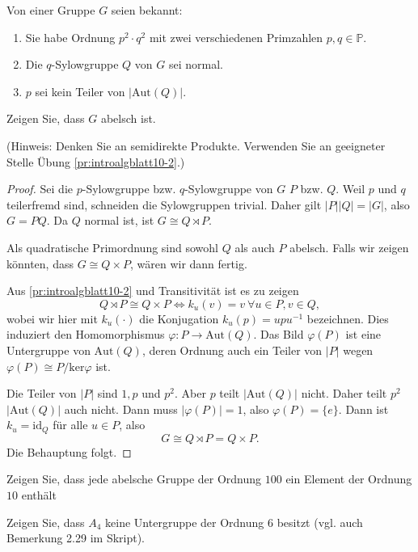 \begin{Problem}
	Von einer Gruppe $G$ seien bekannt:
	\begin{enumerate}[label=(\arabic*)]
		\item Sie habe Ordnung $p^2\cdot q^2$ mit zwei verschiedenen Primzahlen $p,q\in \mathbb{P}$.
		\item Die $q$-Sylowgruppe $Q$ von $G$ sei normal.
		\item $p$ sei kein Teiler von $|\text{Aut}(Q)|$.
	\end{enumerate}
	Zeigen Sie, dass $G$ abelsch ist.

	(Hinweis: Denken Sie an semidirekte Produkte. Verwenden Sie an geeigneter Stelle Übung \ref{pr:introalgblatt10-2}.)  
\end{Problem}
\begin{proof}
	Sei die $p$-Sylowgruppe bzw. $q$-Sylowgruppe von $G$ $P$ bzw. $Q$. Weil $p$ und $q$ teilerfremd sind, schneiden die Sylowgruppen trivial. Daher gilt $|P| |Q|=|G|$, also $G=PQ$. Da $Q$ normal ist, ist $G\cong Q\rtimes P$.  

	Als quadratische Primordnung sind sowohl $Q$ als auch $P$ abelsch. Falls wir zeigen könnten, dass $G\cong Q\times P$, wären wir dann fertig.

	Aus \ref{pr:introalgblatt10-2} und Transitivität ist es zu zeigen
	\[
		Q\rtimes P\cong Q\times P \iff k_u(v)=v~\forall u\in P,v\in Q
	,\] 
	wobei wir hier mit $k_u(\cdot)$ die Konjugation $k_u(p)=upu^{-1}$ bezeichnen. Dies induziert den Homomorphismus $\varphi: P\to \text{Aut}(Q)$. Das Bild $\varphi(P)$ ist eine Untergruppe von $\text{Aut}(Q)$, deren Ordnung auch ein Teiler von $|P|$ wegen $\varphi(P) \cong P / \text{ker}\varphi$ ist. 

	Die Teiler von $|P|$ sind $1,p$ und $p^2$. Aber $p$ teilt $|\text{Aut}(Q)|$ nicht. Daher teilt $p^2$ $|\text{Aut}(Q)|$ auch nicht. Dann muss $|\varphi(P)|=1$, also $\varphi(P)=\{e\} $. Dann ist $k_u=\text{id}_Q$ f\"{u}r alle $u\in P$, also
	\[
	G\cong Q\rtimes P=Q\times P
.\]
Die Behauptung folgt.\qedhere
\end{proof}
\begin{Problem}
	\begin{parts}
	\item Zeigen Sie, dass jede abelsche Gruppe der Ordnung $100$ ein Element der Ordnung $10$ enthält
	\item Zeigen Sie, dass $A_4$ keine Untergruppe der Ordnung $6$ besitzt (vgl. auch Bemerkung 2.29 im Skript).
	\end{parts}
\end{Problem}
